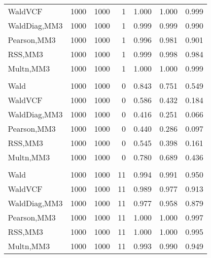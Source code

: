 \documentclass[
]{article}
\begin{document}
\begin{table}[H]
{\begin{tabular}[t]{lrrrrrr}
\hspace{1em}WaldVCF & 1000 & 1000 & 1 & 1.000 & 1.000 & 0.999\\
\hspace{1em}WaldDiag,MM3 & 1000 & 1000 & 1 & 0.999 & 0.999 & 0.990\\
\hspace{1em}Pearson,MM3 & 1000 & 1000 & 1 & 0.996 & 0.981 & 0.901\\
\hspace{1em}RSS,MM3 & 1000 & 1000 & 1 & 0.999 & 0.998 & 0.984\\
\hspace{1em}Multn,MM3 & 1000 & 1000 & 1 & 1.000 & 1.000 & 0.999\\
\addlinespace[0.3em]
\multicolumn{7}{l}{\textbf{2F 10V}}\\
\hspace{1em}Wald & 1000 & 1000 & 0 & 0.843 & 0.751 & 0.549\\
\hspace{1em}WaldVCF & 1000 & 1000 & 0 & 0.586 & 0.432 & 0.184\\
\hspace{1em}WaldDiag,MM3 & 1000 & 1000 & 0 & 0.416 & 0.251 & 0.066\\
\hspace{1em}Pearson,MM3 & 1000 & 1000 & 0 & 0.440 & 0.286 & 0.097\\
\hspace{1em}RSS,MM3 & 1000 & 1000 & 0 & 0.545 & 0.398 & 0.161\\
\hspace{1em}Multn,MM3 & 1000 & 1000 & 0 & 0.780 & 0.689 & 0.436\\
\addlinespace[0.3em]
\multicolumn{7}{l}{\textbf{3F 15V}}\\
\hspace{1em}Wald & 1000 & 1000 & 11 & 0.994 & 0.991 & 0.950\\
\hspace{1em}WaldVCF & 1000 & 1000 & 11 & 0.989 & 0.977 & 0.913\\
\hspace{1em}WaldDiag,MM3 & 1000 & 1000 & 11 & 0.977 & 0.958 & 0.879\\
\hspace{1em}Pearson,MM3 & 1000 & 1000 & 11 & 1.000 & 1.000 & 0.997\\
\hspace{1em}RSS,MM3 & 1000 & 1000 & 11 & 1.000 & 1.000 & 0.995\\
\hspace{1em}Multn,MM3 & 1000 & 1000 & 11 & 0.993 & 0.990 & 0.949\\
\bottomrule
\end{tabular}}
\endgroup{}
\end{table}
\end{document}
